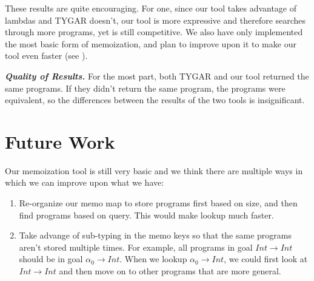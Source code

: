 \documentclass[acmsmall,nonacm]{acmart}
\begin{document}

These results are quite encouraging. For one, since our tool takes advantage of 
lambdas and TYGAR doesn't, our tool is more expressive and therefore searches through 
more programs, yet is still competitive. We also have only implemented the most
basic form of memoization, and plan to improve upon it to make our tool even
faster (see ).



\vspace{2mm}
\noindent \textbf{\textit{Quality of Results.}} For the most part, both TYGAR 
and our tool returned the same programs. If they didn't return the same program,
the programs were equivalent, so the differences between the results of the two
tools is insignificant. 

\section{Future Work}
\label{future}

Our memoization tool is still very basic and we think there are multiple ways in
which we can improve upon what we have:

\begin{enumerate}
  \item Re-organize our memo map to store programs first based on size, and then 
        find programs based on query. This would make lookup much faster.
  \item Take advange of sub-typing in the memo keys so that the same programs
        aren't stored multiple times. For example, all programs in goal 
        $Int \to Int$ should be in goal $\alpha_0 \to Int$. When
        we lookup $\alpha_0 \to Int$, we could first look at $Int \to Int$
        and then move on to other programs that are more general.
\end{enumerate}
\end{document}
